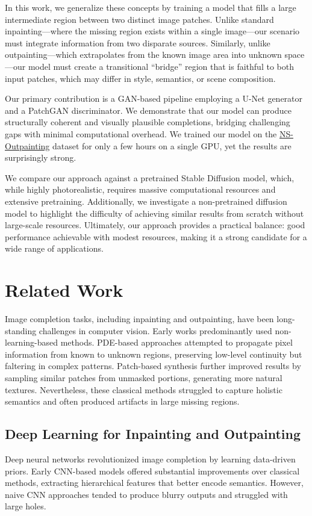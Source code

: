 \documentclass[sigconf]{acmart}
\begin{document}
In this work, we generalize these concepts by training a model that fills a large intermediate region between two distinct image patches. Unlike standard inpainting—where the missing region exists within a single image—our scenario must integrate information from two disparate sources. Similarly, unlike outpainting—which extrapolates from the known image area into unknown space—our model must create a transitional “bridge” region that is faithful to both input patches, which may differ in style, semantics, or scene composition.

Our primary contribution is a GAN-based pipeline employing a U-Net generator and a PatchGAN discriminator. We demonstrate that our model can produce structurally coherent and visually plausible completions, bridging challenging gaps with minimal computational overhead. We trained our model on the \textcolor{red}{\href{https://github.com/z-x-yang/NS-Outpainting}{NS-Outpainting}} dataset for only a few hours on a single GPU, yet the results are surprisingly strong.

We compare our approach against a pretrained Stable Diffusion model, which, while highly photorealistic, requires massive computational resources and extensive pretraining. Additionally, we investigate a non-pretrained diffusion model to highlight the difficulty of achieving similar results from scratch without large-scale resources. Ultimately, our approach provides a practical balance: good performance achievable with modest resources, making it a strong candidate for a wide range of applications.

\section{Related Work}
Image completion tasks, including inpainting and outpainting, have been long-standing challenges in computer vision. Early works predominantly used non-learning-based methods. PDE-based approaches \cite{Bertalmio2000} attempted to propagate pixel information from known to unknown regions, preserving low-level continuity but faltering in complex patterns. Patch-based synthesis \cite{Efros2001,Criminisi2004} further improved results by sampling similar patches from unmasked portions, generating more natural textures. Nevertheless, these classical methods struggled to capture holistic semantics and often produced artifacts in large missing regions.

\subsection*{Deep Learning for Inpainting and Outpainting}
Deep neural networks revolutionized image completion by learning data-driven priors. Early CNN-based models \cite{Xie2012,Zhang2017} offered substantial improvements over classical methods, extracting hierarchical features that better encode semantics. However, naive CNN approaches tended to produce blurry outputs and struggled with large holes.
\end{document}
